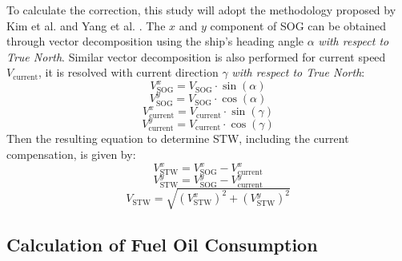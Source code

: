 To calculate the correction, this study will adopt the methodology proposed by Kim et al. \cite{Kim.2020b} and Yang et al. \cite{Yang.2020}. The $x$ and $y$ component of SOG can be obtained through vector decomposition using the ship's heading angle $\alpha$ \emph{with respect to True North}. Similar vector decomposition is also performed for current speed $V_{\text{current}}$, it is resolved with current direction $\gamma$ \emph{with respect to True North}:\\
\begin{equation}\label{eqvgx}
    V_{\text{SOG}}^x = V_{\text{SOG}}\cdot\sin(\alpha)   
\end{equation}
\begin{equation}\label{eqvgy}
    V_{\text{SOG}}^y = V_{\text{SOG}}\cdot\cos(\alpha)   
\end{equation} 
\begin{equation}\label{eqvcx}
     V_{\text{current}}^x = V_{\text{current}}\cdot\sin(\gamma)   
\end{equation}
\begin{equation}\label{eqvcy}
    V_{\text{current}}^y = V_{\text{current}}\cdot\cos(\gamma)   
\end{equation}
Then the resulting equation to determine STW, including the current compensation, is given by:\\
\begin{equation}
    V_{\text{STW}}^x = V_{\text{SOG}}^x - V_{\text{current}}^x    
\end{equation}
\begin{equation}
    V_{\text{STW}}^y = V_{\text{SOG}}^y - V_{\text{current}}^y      
\end{equation}
\begin{equation}
    V_{\text{STW}} = \sqrt{(V_{\text{STW}}^x)^2 + (V_{\text{STW}}^y)^2} 
\end{equation}

\subsection{Calculation of Fuel Oil Consumption}\label{foc_calc}













    
